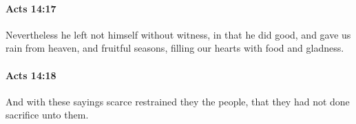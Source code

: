 		\paragraph{Acts 14:17} %
			\label{ACTS-14-17}

			Nevertheless he left not himself without witness, in that he did good, and gave us rain from heaven, and fruitful seasons, filling our hearts with food and gladness.

			\begin{framed}
			\scriptsize
				\begin{compactdesc}
					\item[SBLG] 
				\end{compactdesc}
			\end{framed}

		\paragraph{Acts 14:18} %
			\label{ACTS-14-18}

			And with these sayings scarce restrained they the people, that they had not done sacrifice unto them.


